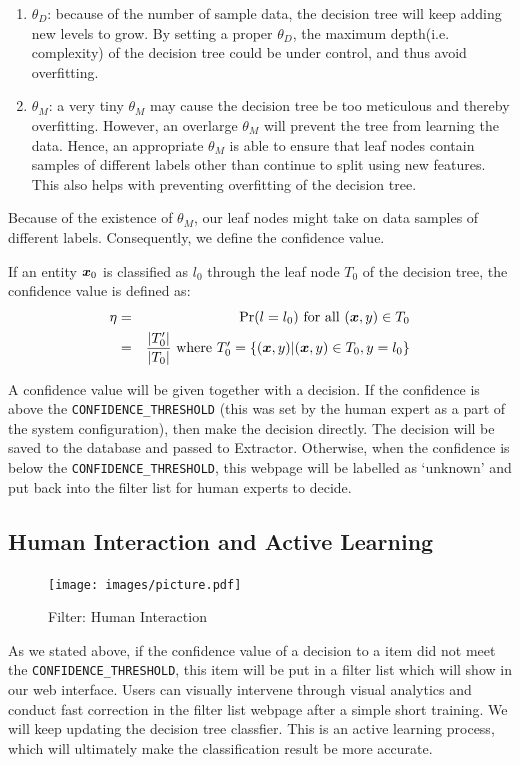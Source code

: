 \begin{enumerate}
	\item  $\theta_D$: because of the number of sample data, the decision tree will keep adding new levels to grow\cite{breiman1984classification}. By setting a proper $\theta_D$, the maximum	depth(i.e. complexity) of the decision tree could be under control, and thus avoid overfitting.
	\item $\theta_M$: a very tiny $\theta_M$ may cause the decision tree be too meticulous and thereby overfitting\cite{quinlan2014c4}. However, an overlarge $\theta_M$ will prevent the tree from learning the data. Hence, an appropriate $\theta_M$ is able to ensure that leaf nodes contain samples of different labels other than continue to split using new features. This also helps with preventing overfitting of the decision tree.
\end{enumerate}

Because of the existence of $\theta_M$, our leaf nodes might take on data samples of different labels. Consequently, we define the confidence value.

\begin{defn}
	If an entity $\boldsymbol{x}_0$ is classified as $l_0$ through the leaf node $T_0$ of the decision tree, the confidence value is defined as:
	\begin{eqnarray}
		\eta &=& \Pr(l=l_0) \mbox{ for all $(\boldsymbol{x},y) \in T_0$}\\
		     &=& \frac{ \vert T_0^\prime  \vert }{\vert T_0 \vert} \mbox{ where $T_0^\prime = \{ (\boldsymbol{x},y) \vert (\boldsymbol{x},y)\in T_0, y = l_0 \}$}
	\end{eqnarray}
\end{defn}

A confidence value will be given together with a decision. If the confidence is above the \texttt{CONFIDENCE\_THRESHOLD} (this was set by the human expert as a part of the system configuration), then make the decision directly. The decision will be saved to the database and passed to Extractor. Otherwise, when the confidence is below the \texttt{CONFIDENCE\_THRESHOLD}, this webpage will be labelled as `unknown' and put back into the filter list for human experts to decide.

\subsection{Human Interaction and Active Learning}
\begin{figure}[htb!]
	\centering
	\texttt{[image: images/picture.pdf]}
	\caption{Filter: Human Interaction}\label{fig:filter:hi}
\end{figure}
As we stated above, if the confidence value of a decision to a item did not meet the \texttt{CONFIDENCE\_THRESHOLD}, this item will be put in a filter list which will show in our web interface. Users can visually intervene through visual analytics and conduct fast correction in the filter list webpage after a simple short training. We will keep updating the decision tree classfier. This is an active learning process, which will ultimately make the classification result be more accurate.

